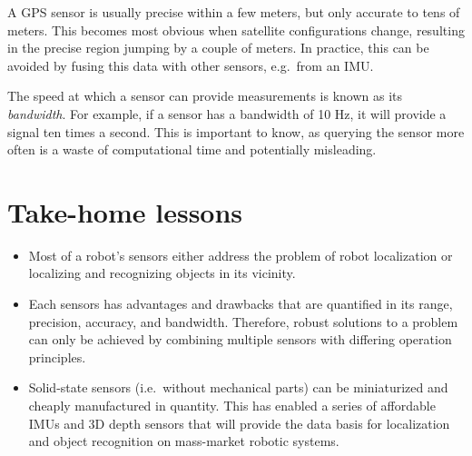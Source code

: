 A GPS sensor is usually precise within a few meters, but only accurate to tens of meters. This becomes most obvious when satellite configurations change, resulting in the precise region jumping by a couple of meters. In practice, this can be avoided by fusing this data with other sensors, e.g.\ from an IMU.

The speed at which a sensor can provide measurements is known as its  \emph{bandwidth}. For example, if a sensor has a bandwidth of 10 Hz, it will provide a signal ten times a second. This is important to know, as querying the sensor more often is a waste of computational time and potentially misleading.


\section*{Take-home lessons}
\begin{itemize}
\item Most of a robot's sensors either address the problem of robot localization or localizing and recognizing objects in its vicinity.
\item Each sensors has advantages and drawbacks that are quantified in its range, precision, accuracy, and bandwidth. Therefore, robust solutions to a problem can only be achieved by combining multiple sensors with differing operation principles.
\item Solid-state sensors (i.e.\ without mechanical parts) can be miniaturized and cheaply manufactured in quantity. This has enabled a series of affordable IMUs and 3D depth sensors that will provide the data basis for localization and object recognition on mass-market robotic systems.
\end{itemize}

